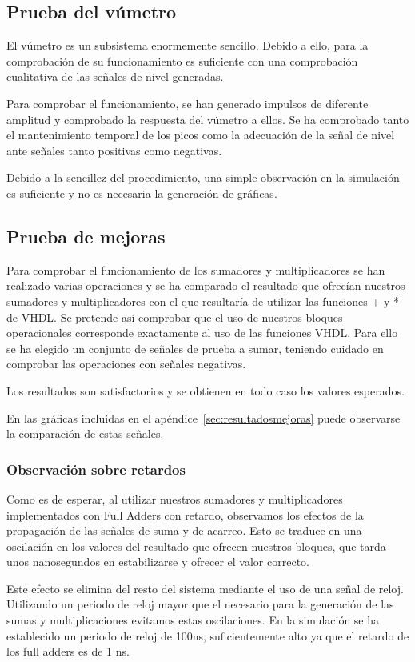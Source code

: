 \documentclass[a4paper,12pt]{article}
\begin{document}
\subsection{Prueba del vúmetro}
El vúmetro es un subsistema enormemente sencillo. Debido a ello, para la comprobación de su funcionamiento es suficiente con una comprobación cualitativa de las señales de nivel generadas.

Para comprobar el funcionamiento, se han generado impulsos de diferente amplitud y comprobado la respuesta del vúmetro a ellos. Se ha comprobado tanto el mantenimiento temporal de los picos como la adecuación de la señal de nivel ante señales tanto positivas como negativas.

Debido a la sencillez del procedimiento, una simple observación en la simulación es suficiente y no es necesaria la generación de gráficas.

\subsection{Prueba de mejoras}
Para comprobar el funcionamiento de los sumadores y multiplicadores se han realizado varias operaciones y se ha comparado el resultado que ofrecían nuestros sumadores y multiplicadores con el que resultaría de utilizar las funciones + y * de VHDL. Se pretende así comprobar que el uso de nuestros bloques operacionales corresponde exactamente al uso de las funciones VHDL. Para ello se ha elegido un conjunto de señales de prueba a sumar, teniendo cuidado en comprobar las operaciones con señales negativas.

Los resultados son satisfactorios y se obtienen en todo caso los valores esperados.

En las gráficas incluidas en el apéndice~\ref{sec:resultadosmejoras} puede observarse la comparación de estas señales.

\subsubsection*{Observación sobre retardos}
Como es de esperar, al utilizar nuestros sumadores y multiplicadores implementados con Full Adders con retardo, observamos los efectos de la propagación de las señales de suma y de acarreo. Esto se traduce en una oscilación en los valores del resultado que ofrecen nuestros bloques, que tarda unos nanosegundos en estabilizarse y ofrecer el valor correcto.

Este efecto se elimina del resto del sistema mediante el uso de una señal de reloj. Utilizando un periodo de reloj mayor que el necesario para la generación de las sumas y multiplicaciones evitamos estas oscilaciones. En la simulación se ha establecido un periodo de reloj de 100ns, suficientemente alto ya que el retardo de los full adders es de 1 ns.
\end{document}
